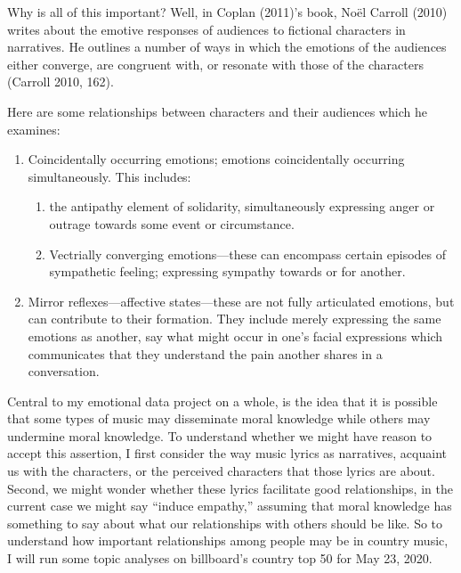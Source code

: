 \documentclass[]{article}
\providecommand{\tightlist}{%
  \setlength{\itemsep}{0pt}\setlength{\parskip}{0pt}}
\begin{document}
Why is all of this important? Well, in Coplan (2011)'s book, Noël
Carroll (2010) writes about the emotive responses of audiences to
fictional characters in narratives. He outlines a number of ways in
which the emotions of the audiences either converge, are congruent with,
or resonate with those of the characters (Carroll 2010, 162).

Here are some relationships between characters and their audiences which
he examines:

\begin{enumerate}
\def\labelenumi{\arabic{enumi}.}
\tightlist
\item
  Coincidentally occurring emotions; emotions coincidentally occurring
  simultaneously. This includes:

  \begin{enumerate}
  \def\labelenumii{\arabic{enumii}.}
  \tightlist
  \item
    the antipathy element of solidarity, simultaneously expressing anger
    or outrage towards some event or circumstance.
  \item
    Vectrially converging emotions---these can encompass certain
    episodes of sympathetic feeling; expressing sympathy towards or for
    another.
  \end{enumerate}
\item
  Mirror reflexes---affective states---these are not fully articulated
  emotions, but can contribute to their formation. They include merely
  expressing the same emotions as another, say what might occur in one's
  facial expressions which communicates that they understand the pain
  another shares in a conversation.
\end{enumerate}

Central to my emotional data project on a whole, is the idea that it is
possible that some types of music may disseminate moral knowledge while
others may undermine moral knowledge. To understand whether we might
have reason to accept this assertion, I first consider the way music
lyrics as narratives, acquaint us with the characters, or the perceived
characters that those lyrics are about. Second, we might wonder whether
these lyrics facilitate good relationships, in the current case we might
say ``induce empathy,'' assuming that moral knowledge has something to
say about what our relationships with others should be like. So to
understand how important relationships among people may be in country
music, I will run some topic analyses on billboard's country top 50 for
May 23, 2020.
\end{document}
